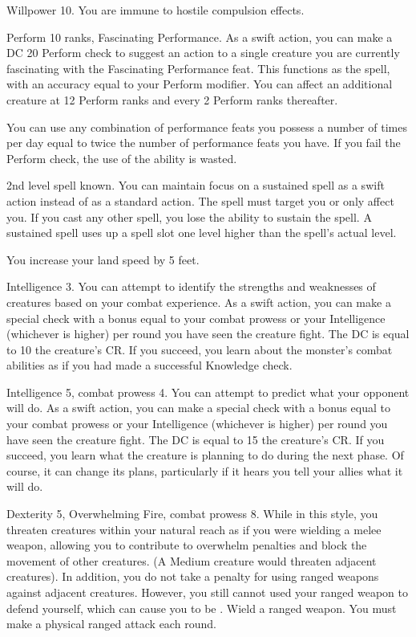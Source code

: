 \featpre Willpower 10.
\featben You are immune to hostile compulsion effects.

\featpres Perform 10 ranks, Fascinating Performance.
\featben As a swift action, you can make a DC 20 Perform check to suggest an action to a single creature you are currently fascinating with the Fascinating Performance feat.
This functions as the  spell, with an accuracy equal to your Perform modifier.
You can affect an additional creature at 12 Perform ranks and every 2 Perform ranks thereafter.

You can use any combination of performance feats you possess a number of times per day equal to twice the number of performance feats you have.
If you fail the Perform check, the use of the ability is wasted.

\featpre 2nd level spell known.
\featben You can maintain focus on a sustained spell as a swift action instead of as a standard action.
The spell must target you or only affect you.
If you cast any other spell, you lose the ability to sustain the spell.
A sustained spell uses up a spell slot one level higher than the spell's actual level.

\featben You increase your land speed by 5 feet.

\featpre Intelligence 3.
\featben You can attempt to identify the strengths and weaknesses of creatures based on your combat experience.
As a swift action, you can make a special check with a bonus equal to your combat prowess or your Intelligence (whichever is higher)  per round you have seen the creature fight.
The DC is equal to 10 \add the creature's CR.
If you succeed, you learn about the monster's combat abilities as if you had made a successful Knowledge check.

\featpres Intelligence 5, combat prowess 4.
\featben You can attempt to predict what your opponent will do.
As a swift action, you can make a special check with a bonus equal to your combat prowess or your Intelligence (whichever is higher)  per round you have seen the creature fight.
The DC is equal to 15 \add the creature's CR.
If you succeed, you learn what the creature is planning to do during the next phase.
Of course, it can change its plans, particularly if it hears you tell your allies what it will do.

\featpres Dexterity 5, Overwhelming Fire, combat prowess 8.
\featben While in this style, you threaten creatures within your natural reach as if you were wielding a melee weapon, allowing you to contribute to overwhelm penalties and block the movement of other creatures.
(A Medium creature would threaten adjacent creatures).
In addition, you do not take a  penalty for using ranged weapons against adjacent creatures.
However, you still cannot used your ranged weapon to defend yourself, which can cause you to be .
\stylereq Wield a ranged weapon.
You must make a physical ranged attack each round.

